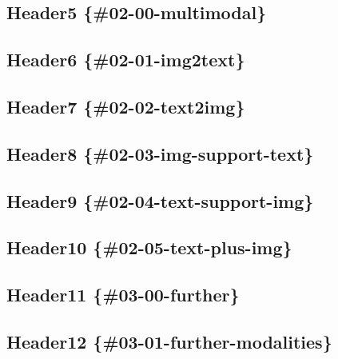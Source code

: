 \documentclass[
]{krantz}
\begin{document}
\hypertarget{header5-02-00-multimodal}{%
\subsection{Header5 \{\#02-00-multimodal\}}\label{header5-02-00-multimodal}}

\hypertarget{header6-02-01-img2text}{%
\subsection{Header6 \{\#02-01-img2text\}}\label{header6-02-01-img2text}}

\hypertarget{header7-02-02-text2img}{%
\subsection{Header7 \{\#02-02-text2img\}}\label{header7-02-02-text2img}}

\hypertarget{header8-02-03-img-support-text}{%
\subsection{Header8 \{\#02-03-img-support-text\}}\label{header8-02-03-img-support-text}}

\hypertarget{header9-02-04-text-support-img}{%
\subsection{Header9 \{\#02-04-text-support-img\}}\label{header9-02-04-text-support-img}}

\hypertarget{header10-02-05-text-plus-img}{%
\subsection{Header10 \{\#02-05-text-plus-img\}}\label{header10-02-05-text-plus-img}}

\hypertarget{header11-03-00-further}{%
\subsection{Header11 \{\#03-00-further\}}\label{header11-03-00-further}}

\hypertarget{header12-03-01-further-modalities}{%
\subsection{Header12 \{\#03-01-further-modalities\}}\label{header12-03-01-further-modalities}}
\end{document}
